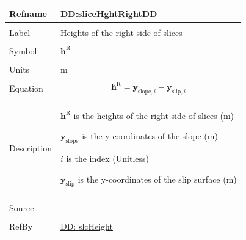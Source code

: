 \documentclass[12pt]{article}
\begin{document}
\vspace{\baselineskip}
\noindent
\begin{minipage}{\textwidth}
\begin{tabular}{>{\raggedright}p{}>{\raggedright\arraybackslash}p{}}
\toprule \textbf{Refname} & \textbf{DD:sliceHghtRightDD}
\label{DD:sliceHghtRightDD}
\\ \midrule \\
Label & Heights of the right side of slices
        
\\ \midrule \\
Symbol & ${\mathbf{h}^{\text{R}}}$
         
\\ \midrule \\
Units & m
        
\\ \midrule \\
Equation & \begin{displaymath}
           {\mathbf{h}^{\text{R}}}={\mathbf{y}_{\text{slope},i}}-{\mathbf{y}_{\text{slip},i}}
           \end{displaymath}
\\ \midrule \\
Description & \begin{symbDescription}
              \item{${\mathbf{h}^{\text{R}}}$ is the heights of the right side of slices (m)}
              \item{${\mathbf{y}_{\text{slope}}}$ is the y-coordinates of the slope (m)}
              \item{$i$ is the index (Unitless)}
              \item{${\mathbf{y}_{\text{slip}}}$ is the y-coordinates of the slip surface (m)}
              \end{symbDescription}
\\ \midrule \\
Source & \cite{fredlund1977}
         
\\ \midrule \\
RefBy & \hyperref[DD:slcHeight]{DD: slcHeight}
        
\\ \bottomrule
\end{tabular}
\end{minipage}
\end{document}

